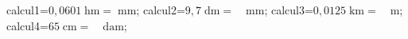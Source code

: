 \documentclass[exercice]{thedocument}%
\begin{document}
%
    \>calcul1=$0,0601\;\text{hm}=\;\text{mm}$;%
    \>calcul2=$9,7\;\text{dm}=\quad\text{mm}$;%
    \>calcul3=$0,0125\;\text{km}=\quad\text{m}$;%
    \>calcul4=$65\;\text{cm}=\quad\text{dam}$;%
\end{document}
